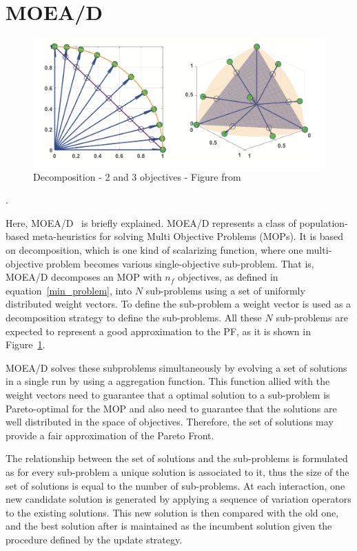 
\section{MOEA/D}\label{sec:background} 

\begin{figure}[!t]\label{decomp-example}
	\centering
	\includegraphics[width=\textwidth]{images/decomp2.png}
	\caption{Decomposition  -  2 and 3 objectives - Figure from \cite{chugh2017handling} }
\end{figure}.

Here, MOEA/D~\cite{zhang2007moea} is briefly explained. MOEA/D represents a class of population-based meta-heuristics for solving Multi Objective Problems (MOPs). It is based on decomposition, which is one kind of scalarizing function, where one multi-objective problem becomes various single-objective sub-problem. That is, MOEA/D decomposes an MOP with $n_f$ objectives, as defined in equation~\ref{min_problem}, into $N$  sub-problems using a set of uniformly distributed weight vectors. To define the sub-problem a weight vector is used as a decomposition strategy to  define the sub-problems.  All these $N$ sub-problems are expected to represent a good approximation to the PF, as it is shown in Figure~\ref{decomp-example}.

MOEA/D solves these subproblems simultaneously by evolving a set of solutions in a single run by using a aggregation function. This function allied with the weight vectors need to guarantee that a optimal solution to a sub-problem is Pareto-optimal for the MOP and also need to guarantee that the solutions are well distributed in the space of objectives. Therefore, the set of solutions may provide a fair approximation of the Pareto Front.

The relationship between the set of solutions and the sub-problems is formulated as for every sub-problem a unique solution is associated to it, thus the size of the set of solutions is equal to the number of sub-problems.  At each interaction, one new candidate solution is generated by applying a sequence of variation operators to the existing solutions. This new solution is then compared with the old one, and the best solution after is maintained as the incumbent solution given the procedure defined by the update strategy.

